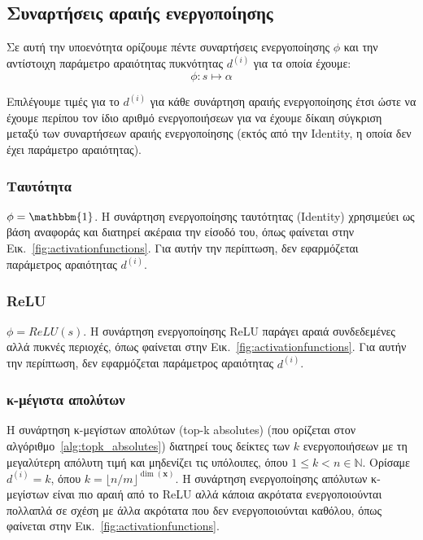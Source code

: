 \subsection{Συναρτήσεις αραιής ενεργοποίησης}
\label{sec6:safs}
Σε αυτή την υποενότητα ορίζουμε πέντε συναρτήσεις ενεργοποίησης $\phi$ και την αντίστοιχη παράμετρο αραιότητας πυκνότητας $d^{(i)}$ για τα οποία έχουμε:
\begin{equation}
	\label{eq:phi}
	\phi: s \longmapsto \alpha
\end{equation}

Επιλέγουμε τιμές για το $d^{(i)}$ για κάθε συνάρτηση αραιής ενεργοποίησης έτσι ώστε να έχουμε περίπου τον ίδιο αριθμό ενεργοποιήσεων για να έχουμε δίκαιη σύγκριση μεταξύ των συναρτήσεων αραιής ενεργοποίησης (εκτός από την Identity, η οποία δεν έχει παράμετρο αραιότητας).

\subsubsection{Ταυτότητα}
\label{sec6:identity}
$\phi = \mathbbm{1}$.
Η συνάρτηση ενεργοποίησης ταυτότητας (Identity) χρησιμεύει ως βάση αναφοράς και διατηρεί ακέραια την είσοδό του, όπως φαίνεται στην Εικ.~\ref{fig:activationfunctions}.
Για αυτήν την περίπτωση, δεν εφαρμόζεται παράμετρος αραιότητας $d^{(i)}$.

\subsubsection{ReLU}
\label{sec6:relu}
$\phi = ReLU(s)$.
Η συνάρτηση ενεργοποίησης ReLU παράγει αραιά συνδεδεμένες αλλά πυκνές περιοχές, όπως φαίνεται στην Εικ.~\ref{fig:activationfunctions}.
Για αυτήν την περίπτωση, δεν εφαρμόζεται παράμετρος αραιότητας $d^{(i)}$.

\subsubsection{κ-μέγιστα απολύτων}
\label{sec6:topk_absolutes}
Η συνάρτηση κ-μεγίστων απολύτων (top-k absolutes) (που ορίζεται στον αλγόριθμο~\ref{alg:topk_absolutes}) διατηρεί τους δείκτες των $k$ ενεργοποιήσεων με τη μεγαλύτερη απόλυτη τιμή και μηδενίζει τις υπόλοιπες, όπου $1 \le k <n \in \mathbb{N}$.
Ορίσαμε $d^{(i)} = k$, όπου $k = \lfloor n / m \rfloor^{\dim(\bm{x})}$.
Η συνάρτηση ενεργοποίησης απόλυτων κ-μεγίστων είναι πιο αραιή από το ReLU αλλά κάποια ακρότατα ενεργοποιούνται πολλαπλά σε σχέση με άλλα ακρότατα που δεν ενεργοποιούνται καθόλου, όπως φαίνεται στην Εικ.~\ref{fig:activationfunctions}.

